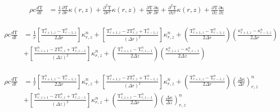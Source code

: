 \documentclass[12pt]{article}
\begin{document}
		\begin{equation}
		\begin{aligned}
		\rho c \frac{d\mathrm{T}}{dt} &= \frac{1}{r} \frac{\partial\mathrm{T}}{\partial r}\kappa(r, z) + \frac{\partial^2\mathrm{T}}{\partial r^2}\kappa(r, z)  + \frac{\partial\mathrm{T}}{\partial r} \frac{\partial\mathrm{\kappa}}{\partial r}  + \frac{\partial^2\mathrm{T}}{\partial z^2}\kappa(r, z) + \frac{\partial\mathrm{T}}{\partial z}\frac{\partial\mathrm{\kappa}}{\partial z} \\
		\end{aligned}
		\end{equation}
		
		\begin{equation}
		\begin{aligned}
		\rho c \frac{d\mathrm{T}}{dt} &= \frac{1}{r} \left [\frac{\mathrm{T}^{n}_{r + 1, z} - \mathrm{T}^{n}_{r - 1, z}}{2\Delta r}  \right ]\kappa^{n}_{r, z} + \left [\frac{\mathrm{T}^{n}_{r + 1, z}  - 2 \mathrm{T}^{n}_{r, z} +  \mathrm{T}^{n}_{r - 1, z}}{(\Delta r)^2} \right ]  \kappa^{n}_{r, z} + (\frac{\mathrm{T}^{n}_{r + 1, z} - \mathrm{T}^{n}_{r - 1, z}}{2\Delta r}) (\frac{\kappa^{n}_{r + 1, z} - \kappa^{n}_{r - 1, z}}{2\Delta r}) \\
		&+ \left [\frac{\mathrm{T}^{n}_{r, z + 1}  - 2 \mathrm{T}^{n}_{r, z} +  \mathrm{T}^{n}_{r, z -1}}{(\Delta z)^2} \right ]\kappa^n_{r, z} + (\frac{\mathrm{T}^{n}_{r, z + 1} - \mathrm{T}^{n}_{r, z - 1}}{2\Delta z})(\frac{\kappa^{n}_{r, z + 1} - \kappa^{n}_{r,z - 1}}{2\Delta z}) \\
		\end{aligned}
		\end{equation}
		
		\begin{equation}
		\begin{aligned}
		\rho c \frac{d\mathrm{T}}{dt} &= \frac{1}{r} \left [\frac{\mathrm{T}^{n}_{r + 1, z} - \mathrm{T}^{n}_{r - 1, z}}{2\Delta r}  \right ]\kappa^{n}_{r, z} + \left [\frac{\mathrm{T}^{n}_{r + 1, z}  - 2 \mathrm{T}^{n}_{r, z} +  \mathrm{T}^{n}_{r - 1, z}}{(\Delta r)^2} \right ]  \kappa^{n}_{r, z} + (\frac{\mathrm{T}^{n}_{r + 1, z} - \mathrm{T}^{n}_{r - 1, z}}{2\Delta r}) (\frac{\Delta \kappa}{\Delta r})^n_{r, z} \\
		&+ \left [\frac{\mathrm{T}^{n}_{r, z + 1}  - 2 \mathrm{T}^{n}_{r, z} +  \mathrm{T}^{n}_{r, z -1}}{(\Delta z)^2} \right ]\kappa^n_{r, z} + (\frac{\mathrm{T}^{n}_{r, z + 1} - \mathrm{T}^{n}_{r, z - 1}}{2\Delta r})(\frac{\Delta \kappa}{\Delta z})^n_{r, z} \\
		\end{aligned}
		\end{equation}
		
\end{document}
